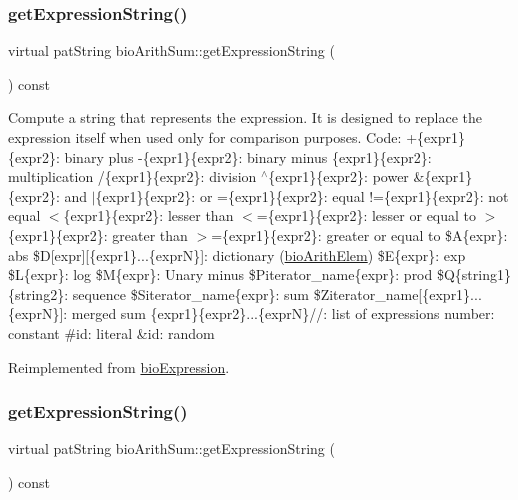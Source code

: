 \subsubsection{\texorpdfstring{get\+Expression\+String()}{getExpressionString()}\hspace{0.1cm}{\footnotesize\ttfamily [3/4]}}
{\footnotesize\ttfamily virtual pat\+String bio\+Arith\+Sum\+::get\+Expression\+String (\begin{DoxyParamCaption}{ }\end{DoxyParamCaption}) const\hspace{0.3cm}{\ttfamily [virtual]}}

Compute a string that represents the expression. It is designed to replace the expression itself when used only for comparison purposes. Code\+: +\{expr1\}\{expr2\}\+: binary plus -\/\{expr1\}\{expr2\}\+: binary minus \{expr1\}\{expr2\}\+: multiplication /\{expr1\}\{expr2\}\+: division $^\wedge$\{expr1\}\{expr2\}\+: power \&\{expr1\}\{expr2\}\+: and $\vert$\{expr1\}\{expr2\}\+: or =\{expr1\}\{expr2\}\+: equal !=\{expr1\}\{expr2\}\+: not equal $<$\{expr1\}\{expr2\}\+: lesser than $<$=\{expr1\}\{expr2\}\+: lesser or equal to $>$\{expr1\}\{expr2\}\+: greater than $>$=\{expr1\}\{expr2\}\+: greater or equal to \$A\{expr\}\+: abs \$D\mbox{[}expr\mbox{]}\mbox{[}\{expr1\}...\{exprN\}\mbox{]}\+: dictionary (\hyperlink{classbio_arith_elem}{bio\+Arith\+Elem}) \$E\{expr\}\+: exp \$L\{expr\}\+: log \$M\{expr\}\+: Unary minus \$\+Piterator\+\_\+name\{expr\}\+: prod \$Q\{string1\}\{string2\}\+: sequence \$\+Siterator\+\_\+name\{expr\}\+: sum \$\+Ziterator\+\_\+name\mbox{[}\{expr1\}...\{exprN\}\mbox{]}\+: merged sum \{expr1\}\{expr2\}...\{exprN\}//\+: list of expressions number\+: constant \#id\+: literal \&id\+: random 

Reimplemented from \hyperlink{classbio_expression_a3e4b4dca58dbbc6f0e411b30eb3f60b4}{bio\+Expression}.

\mbox{\label{classbio_arith_sum_a1354d70bccf4ba5e3d8ca634005d5489}} 
\subsubsection{\texorpdfstring{get\+Expression\+String()}{getExpressionString()}\hspace{0.1cm}{\footnotesize\ttfamily [4/4]}}
{\footnotesize\ttfamily virtual pat\+String bio\+Arith\+Sum\+::get\+Expression\+String (\begin{DoxyParamCaption}{ }\end{DoxyParamCaption}) const\hspace{0.3cm}{\ttfamily [virtual]}}

